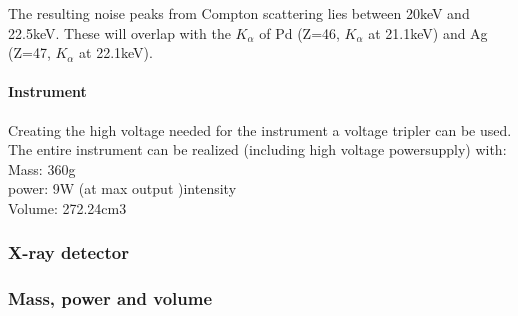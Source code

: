 The resulting noise peaks from Compton scattering lies between 20keV and 22.5keV. These will overlap with the $K_\alpha$ of Pd (Z=46, $K_\alpha$ at 21.1keV) and Ag (Z=47, $K_\alpha$ at 22.1keV).

\paragraph{Instrument}
Creating the high voltage needed for the instrument a voltage tripler can be used. The entire instrument can be realized (including high voltage powersupply) with\citep{AmptekSource}:
Mass: 360g\\
power: 9W (at max output )intensity\\
Volume: 272.24cm3

\subsubsection{X-ray detector}











\subsubsection{Mass, power and volume}




